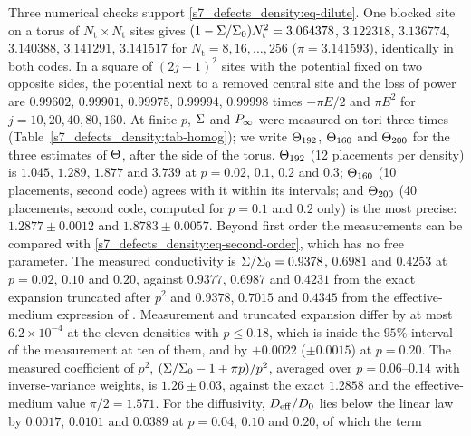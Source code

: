 Three numerical checks support \eqref{s7_defects_density:eq-dilute}. One blocked site on a torus of
$N_{\mathrm t}\times N_{\mathrm t}$ sites gives
$(1-\Sigma/\Sigma_{0})N_{\mathrm t}^{2}=3.064378$, $3.122318$, $3.136774$, $3.140388$, $3.141291$, $3.141517$ for
$N_{\mathrm t}=8,16,\dots,256$ ($\pi=3.141593$), identically in both codes. %
In a square of $(2j+1)^{2}$ sites with the potential fixed on two opposite sides, the potential next to a
removed central site and the loss of power are $0.99602$, $0.99901$, $0.99975$, $0.99994$, $0.99998$ times $-\pi E/2$
and $\pi E^{2}$ for $j=10,20,40,80,160$. %
At finite $p$, $\Sigma$ and $P_{\infty}$ were measured on tori three times
(Table~\ref{s7_defects_density:tab-homog}); we write $\Theta_{192}$, $\Theta_{160}$ and $\Theta_{200}$ for the
three estimates of $\Theta$, after the side of the torus. $\Theta_{192}$ (12 placements per density) is
$1.045$, $1.289$, $1.877$ and $3.739$ at $p=0.02$, $0.1$, $0.2$ and $0.3$; $\Theta_{160}$ (10 placements,
second code) agrees with it within its intervals; and $\Theta_{200}$ (40 placements, second code, computed for
$p=0.1$ and $0.2$ only) is the most precise: $1.2877\pm0.0012$ and $1.8783\pm0.0057$.
Beyond first order the measurements can be compared with \eqref{s7_defects_density:eq-second-order}, which has no
free parameter. The measured conductivity is $\Sigma/\Sigma_{0}=0.9378$, $0.6981$ and $0.4253$ at $p=0.02$, $0.10$ and
$0.20$, against $0.9377$, $0.6987$ and $0.4231$ from the exact expansion truncated after $p^{2}$ and $0.9378$,
$0.7015$ and $0.4345$ from the effective-medium expression of \citet{WatsonLeath1974}. Measurement and truncated
expansion differ by at most $6.2\times10^{-4}$ at the eleven densities with $p\le0.18$, which is inside the $95\%$ interval
of the measurement at ten of them, and by $+0.0022$ ($\pm0.0015$) at $p=0.20$. The measured coefficient of $p^{2}$,
$(\Sigma/\Sigma_{0}-1+\pi p)/p^{2}$, averaged over $p=0.06$--$0.14$ with inverse-variance weights, is $1.26\pm0.03$,
against the exact $1.2858$ and the effective-medium value $\pi/2=1.571$. For the diffusivity, $D_{\mathrm{eff}}/D_{0}$ lies
below the linear law by $0.0017$, $0.0101$ and $0.0389$ at $p=0.04$, $0.10$ and $0.20$, of which the term
